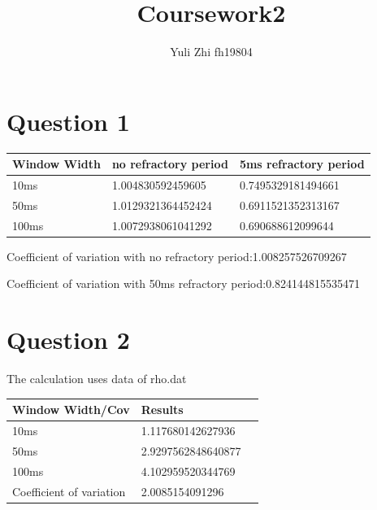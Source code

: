 \documentclass[fleqn,11pt]{article}
\begin{document}
\title{Coursework2}
\author{Yuli Zhi fh19804}
\date{}
\maketitle
\section*{Question 1}
\begin{center}
    \centering
    \begin{tabular}{|l|l|l|}
    \hline
    Window Width & no refractory period & 5ms refractory period \\ \hline
    10ms                               & 1.004830592459605                                                                                  &  0.7495329181494661                                        \\ \hline
    50ms                               & 1.0129321364452424                                                                                  & 0.6911521352313167                                         \\ \hline
    100ms                              & 1.0072938061041292                                                                                  & 0.690688612099644                                         \\ \hline
    \end{tabular}
\end{center}
\par Coefficient of variation with no refractory period:1.008257526709267
\par Coefficient of variation with 50ms refractory period:0.824144815535471


\section*{Question 2}
\par The calculation uses data of rho.dat
\begin{center}
    \centering
    \begin{tabular}{|l|l|l|}
    \hline
    Window Width/Cov & Results  \\ \hline
    10ms                               & 1.117680142627936   \\ \hline
    50ms                               & 2.9297562848640877  \\ \hline
    100ms                              & 4.102959520344769   \\ \hline
    Coefficient of variation           & 2.0085154091296     \\ \hline
    \end{tabular}
\end{center}
\end{document}
